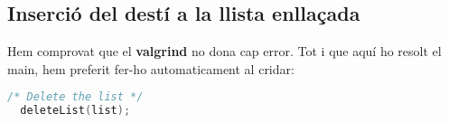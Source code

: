 \subsection{Inserció del destí a la llista enllaçada}

Hem comprovat que el \textbf{valgrind} no dona cap error.
Tot i que aquí ho resolt el main, hem preferit fer-ho automaticament al cridar:
\begin{lstlisting}[language=C]
  /* Delete the list */
  deleteList(list);
\end{lstlisting}
